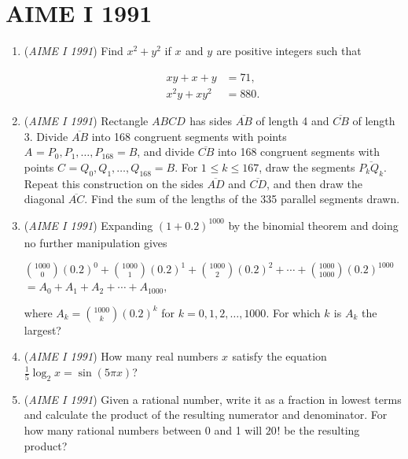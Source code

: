\section{AIME I 1991}
        \begin{enumerate}
        	\item (\textit{AIME I 1991}) Find $x^2+y^2_{}$ if $x_{}^{}$ and $y_{}^{}$ are positive integers such that

 \begin{align*} xy+x+y&=71, \\ x^2y+xy^2&=880. \end{align*}



	\item (\textit{AIME I 1991}) Rectangle $ABCD_{}^{}$ has sides $\overline {AB}$ of length 4 and $\overline {CB}$ of length 3. Divide $\overline {AB}$ into 168 congruent segments with points $A_{}^{}=P_0, P_1, \ldots, P_{168}=B$, and divide $\overline {CB}$ into 168 congruent segments with points $C_{}^{}=Q_0, Q_1, \ldots, Q_{168}=B$. For $1_{}^{} \le k \le 167$, draw the segments $\overline {P_kQ_k}$. Repeat this construction on the sides $\overline {AD}$ and $\overline {CD}$, and then draw the diagonal $\overline {AC}$. Find the sum of the lengths of the 335 parallel segments drawn.


 

	\item (\textit{AIME I 1991}) Expanding $(1+0.2)^{1000}_{}$ by the binomial theorem and doing no further manipulation gives


 ${1000 \choose 0}(0.2)^0+{1000 \choose 1}(0.2)^1+{1000 \choose 2}(0.2)^2+\cdots+{1000 \choose 1000}(0.2)^{1000}$
$= A_0 + A_1 + A_2 + \cdots + A_{1000},$

 where $A_k = {1000 \choose k}(0.2)^k$ for $k = 0,1,2,\ldots,1000$. For which $k_{}^{}$ is $A_k^{}$ the largest?


 

	\item (\textit{AIME I 1991}) How many real numbers $x^{}_{}$ satisfy the equation $\frac{1}{5}\log_2 x = \sin (5\pi x)$?


 

	\item (\textit{AIME I 1991}) Given a rational number, write it as a fraction in lowest terms and calculate the product of the resulting numerator and denominator. For how many rational numbers between 0 and 1 will  $20_{}^{}!$ be the resulting product? 



\end{enumerate}
